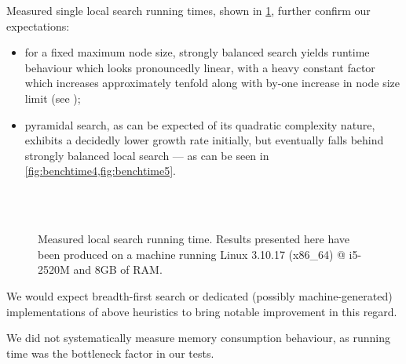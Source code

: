 \documentclass[titlepage,twoside,index=totoc,bibliography=totoc]{scrartcl}
\numberwithin{equation}{section}
\numberwithin{figure}{section}
\numberwithin{table}{section}
\begin{document}
Measured single local search running times, shown in \cref{fig:benchTIME},
further confirm our expectations:

\begin{itemize}
  \item
    for a fixed maximum node size, strongly balanced search yields runtime
    behaviour which looks pronouncedly linear, with a heavy constant
    factor which increases approximately tenfold along with
    by-one increase in node size limit
    (see );
  \item
    pyramidal search, as can be expected of its quadratic complexity
    nature, exhibits a decidedly lower growth rate initially, but eventually
    falls behind strongly balanced local search --- as can be seen
    in \cref{fig:benchtime4,fig:benchtime5}.
\end{itemize}

\begin{figure}[htbp]
\centering
  \null\hfill%
  \hfill\null
  \null\hfill%
  \hfill\null\\
  \null\hfill%
  \hfill\null\\
  \null\hfill%
  \hfill\null
  \null\hfill%
  \hfill\null
\caption{%
  Measured local search running time.
  Results presented here have been produced on a machine running
  Linux 3.10.17 ({\ttfamily x86\_64}) @ i5-2520M and 8GB of RAM.
}
\label{fig:benchTIME}
\end{figure}

We would expect breadth-first search or dedicated (possibly
machine-generated) implementations of above heuristics to bring
notable improvement in this regard.

We did not systematically measure memory consumption behaviour, as running
time was the bottleneck factor in our tests.
\end{document}
